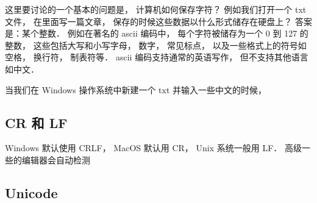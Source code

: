 
这里要讨论的一个基本的问题是， 计算机如何保存字符？ 例如我们打开一个 txt 文件， 在里面写一篇文章， 保存的时候这些数据以什么形式储存在硬盘上？ 答案是：某个整数． 例如在著名的 ascii 编码中， 每个字符被储存为一个 0 到 127 的整数， 这些包括大写和小写字母， 数字， 常见标点， 以及一些格式上的符号如空格， 换行符， 制表符等． ascii 编码支持通常的英语写作， 但不支持其他语言如中文．

当我们在 Windows 操作系统中新建一个 txt 并输入一些中文的时候， 

\subsection{CR 和 LF}
Windows 默认使用 CRLF， MacOS 默认用 CR， Unix 系统一般用 LF． 高级一些的编辑器会自动检测

\subsection{Unicode}

